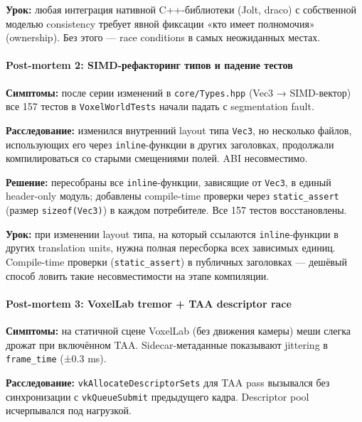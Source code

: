 \documentclass[
  11pt,a4paper,oneside]{article}
\begin{document}
\textbf{Урок:} любая интеграция нативной C++-библиотеки (Jolt, draco) с собственной моделью consistency требует явной фиксации «кто имеет полномочия» (ownership). Без этого --- race conditions в самых неожиданных местах.

\paragraph{Post-mortem 2: SIMD-рефакторинг типов и падение тестов}\label{post-mortem-2-simd-ux440ux435ux444ux430ux43aux442ux43eux440ux438ux43dux433-ux442ux438ux43fux43eux432-ux438-ux43fux430ux434ux435ux43dux438ux435-ux442ux435ux441ux442ux43eux432}

\textbf{Симптомы:} после серии изменений в \texttt{core/Types.hpp} (Vec3 → SIMD-вектор) все 157 тестов в \texttt{VoxelWorldTests} начали падать с segmentation fault.

\textbf{Расследование:} изменился внутренний layout типа \texttt{Vec3}, но несколько файлов, использующих его через \texttt{inline}-функции в других заголовках, продолжали компилироваться со старыми смещениями полей. ABI несовместимо.

\textbf{Решение:} пересобраны все \texttt{inline}-функции, зависящие от \texttt{Vec3}, в единый header-only модуль; добавлены compile-time проверки через \texttt{static\_assert} (размер \texttt{sizeof(Vec3)}) в каждом потребителе. Все 157 тестов восстановлены.

\textbf{Урок:} при изменении layout типа, на который ссылаются \texttt{inline}-функции в других translation units, нужна полная пересборка всех зависимых единиц. Compile-time проверки (\texttt{static\_assert}) в публичных заголовках --- дешёвый способ ловить такие несовместимости на этапе компиляции.

\paragraph{Post-mortem 3: VoxelLab tremor + TAA descriptor race}\label{post-mortem-3-voxellab-tremor--taa-descriptor-race}

\textbf{Симптомы:} на статичной сцене VoxelLab (без движения камеры) меши слегка дрожат при включённом TAA. Sidecar-метаданные показывают jittering в \texttt{frame\_time} (±0.3 ms).

\textbf{Расследование:} \texttt{vkAllocateDescriptorSets} для TAA pass вызывался без синхронизации с \texttt{vkQueueSubmit} предыдущего кадра. Descriptor pool исчерпывался под нагрузкой.
\end{document}
